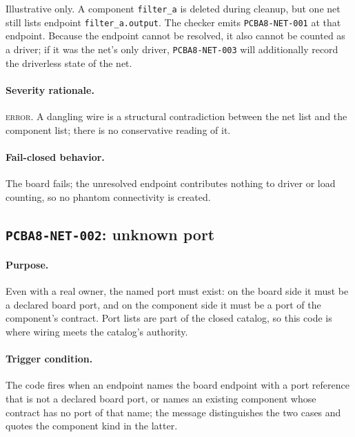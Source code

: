 \begin{example}\label{ch07:ex:net001}
Illustrative only. A component \texttt{filter\_a} is deleted during cleanup, but one net still lists endpoint \texttt{filter\_a.output}. The checker emits \texttt{PCBA8-NET-001} at that endpoint. Because the endpoint cannot be resolved, it also cannot be counted as a driver; if it was the net's only driver, \texttt{PCBA8-NET-003} will additionally record the driverless state of the net.
\end{example}

\paragraph{Severity rationale.} \textsc{error}. A dangling wire is a structural contradiction between the net list and the component list; there is no conservative reading of it.

\paragraph{Fail-closed behavior.} The board fails; the unresolved endpoint contributes nothing to driver or load counting, so no phantom connectivity is created.

\subsection{\texttt{PCBA8-NET-002}: unknown port}\label{ch07:sub:net002}

\paragraph{Purpose.} Even with a real owner, the named port must exist: on the board side it must be a declared board port, and on the component side it must be a port of the component's contract. Port lists are part of the closed catalog, so this code is where wiring meets the catalog's authority.

\paragraph{Trigger condition.} The code fires when an endpoint names the board endpoint with a port reference that is not a declared board port, or names an existing component whose contract has no port of that name; the message distinguishes the two cases and quotes the component kind in the latter.

